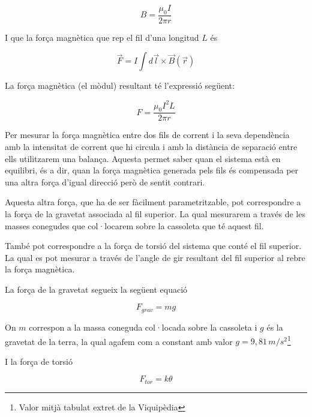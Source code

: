 \documentclass[11pt]{article}
\numberwithin{equation}{section}
\numberwithin{figure}{section}
\numberwithin{table}{section}
\begin{document}
\begin{equation}\label{eq_PR2: PR2_camp_fil_infinit}
    B = \frac{\mu_0I}{2\pi r}
\end{equation}

I que la força magnètica que rep el fil d'una longitud $L$ és

\begin{equation}\label{eq: PR2_Fmagn_en_funcio_B}
    \vec{F} = I\int d\vec{l}\times\vec{B}(\vec{r})
\end{equation}

La força magnètica (el mòdul) resultant té l'expressió següent:

\begin{equation}\label{eq: PR2_Fm_entre_fils}
    F = \frac{\mu_0I^2L}{2\pi r}
\end{equation}

Per mesurar la força magnètica entre dos fils de corrent i la seva dependència amb la intensitat de corrent que hi circula i amb la distància de separació entre ells utilitzarem una balança. Aquesta permet saber quan el sistema està en equilibri, és a dir, quan la força magnètica generada pels fils és compensada per una altra força d'igual direcció però de sentit contrari. 

Aquesta altra força, que ha de ser fàcilment parametritzable, pot correspondre a la força de la gravetat associada al fil superior. La qual mesurarem a través de les masses conegudes que col·locarem sobre la cassoleta que té aquest fil.

També pot correspondre a la força de torsió del sistema que conté el fil superior. La qual es pot mesurar a través de l'angle de gir resultant del fil superior al rebre la força magnètica.
 
La força de la gravetat segueix la següent equació

\begin{equation}\label{eq: PR2_Fgrav}
    F_{grav} = mg
\end{equation}

On $m$ correspon a la massa coneguda col·locada sobre la cassoleta i $g$ és la gravetat de la terra, la qual agafem com a constant amb valor $g = 9,81 \, m/s^2$\footnote{Valor mitjà tabulat extret de la Viquipèdia}

I la força de torsió

\begin{equation}\label{PR2_Ftorsio}
    F_{tor} = k\theta
\end{equation}
\end{document}
